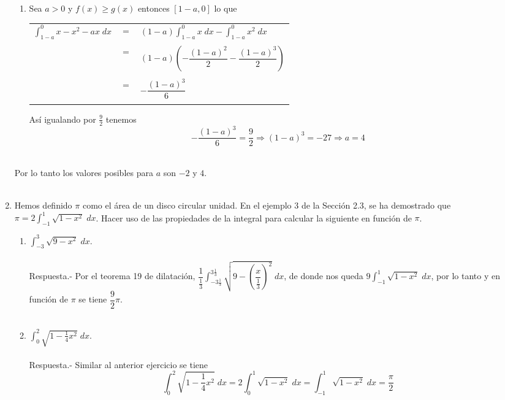 \begin{enumerate}
\begin{enumerate}[\bfseries C 1.]
	\item Sea $a>0$ y  $f(x)\geq g(x)$ entonces $[1-a,0]$ lo que 
	    \begin{center}
		\begin{tabular}{rcl}
		    $\displaystyle\int_{1-a}^0 x-x^2-ax \; dx$&$=$&$\displaystyle(1-a)\int_{1-a}^0 x\; dx  - \int_{1-a}^0 x^2 \; dx$\\\\ 
		    &$=$&$(1-a)\left(-\dfrac{(1-a)^2}{2} - \dfrac{(1-a)^3}{2}\right)$\\\\
		    &$=$&$-\dfrac{(1-a)^3}{6}$\\\\
		\end{tabular}
	    \end{center}
	    Así igualando por $\frac{9}{2}$ tenemos 
	    $$-\dfrac{(1-a)^3}{6} = \dfrac{9}{2} \Longrightarrow (1-a)^3 = -27 \Longrightarrow a=4$$\\
    \end{enumerate}
    Por lo tanto los valores posibles para $a$ son $-2$ y $4$.\\\\

\item Hemos definido $\pi$ como el área de un disco circular unidad. En el ejemplo 3 de la Sección 2.3, se ha demostrado que $\pi=2 \int_{-1}^1 \sqrt{1-x^2}\; dx$. Hacer uso de las propiedades de la integral para calcular la siguiente en función de $\pi$.
\begin{enumerate}[\bfseries (a)]

    \item $\displaystyle\int_{-3}^3 \sqrt{9-x^2}\; dx$.\\\\
	Respuesta.-\; Por el teorema 19 de dilatación, $\dfrac{1}{\frac{1}{3}}\displaystyle\int_{-3\frac{1}{3}}^{3\frac{1}{3}} \sqrt{9 - \left(\dfrac{x}{\frac{1}{3}}\right)^2} \; dx$, de donde nos queda $9 \displaystyle\int_{-1}^1 \sqrt{1-x^2}\; dx$, por lo tanto y en función de $\pi$ se tiene $\dfrac{9}{2} \pi$.\\\\

    \item $\displaystyle\int_0^2 \sqrt{1-\frac{1}{4}x^2}\; dx$.\\\\
	Respuesta.-\; Similar al anterior ejercicio se tiene 
	$$\int_0^2 \sqrt{1-\dfrac{1}{4}x^2}\; dx = 2\int_0^1 \sqrt{1-x^2}\; dx = \int_{-1}^1 \sqrt{1-x^2}\; dx = \dfrac{\pi}{2}$$\\


\end{enumerate}
\end{enumerate}
